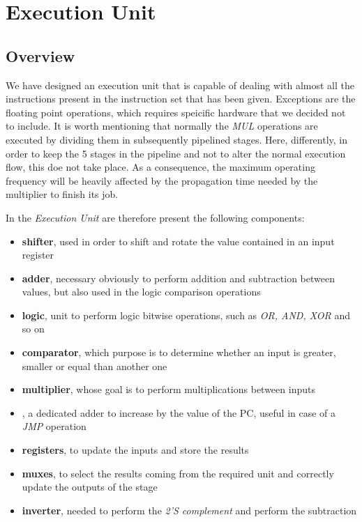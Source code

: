 \chapter{Execution Unit}
\label{chap_exu}

\section{Overview}
We have designed an execution unit that is capable of dealing with almost all the instructions present in the instruction set that has been given. Exceptions are the floating point operations, which requires speicific hardware that we decided not to include. It is worth mentioning that normally the \textit{MUL} operations are executed by dividing them in subsequently pipelined stages. Here, differently, in order to keep the 5 stages in the pipeline and not to alter the normal execution flow, this doe not take place. As a consequence, the maximum operating frequency will be heavily affected by the propagation time needed by the multiplier to finish its job.


In the \textit{Execution Unit} are therefore present the following components:
\begin{itemize}
	\item \textbf{shifter}, used in order to shift and rotate the value contained in an input register
	\item \textbf{adder}, necessary obviously to perform addition and subtraction between values, but also used in the logic comparison operations
	\item \textbf{logic}, unit to perform logic bitwise operations, such as \textit{OR, AND, XOR} and so on
	\item \textbf{comparator}, which purpose is to determine whether an input is greater, smaller or equal than another one
	\item \textbf{multiplier}, whose goal is to perform multiplications between inputs
	\item {}, a dedicated adder to increase by the value of the PC, useful in case of a \textit{JMP} operation
	\item \textbf{registers}, to update the inputs and store the results
	\item \textbf{muxes}, to select the results coming from the required unit and correctly update the outputs of the stage
	\item \textbf{inverter}, needed to perform the \textit{2'S complement} and perform the subtraction
\end{itemize}


